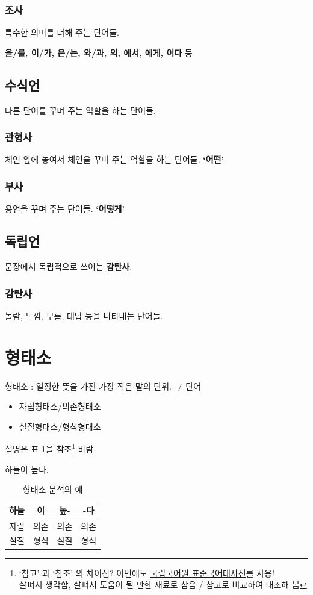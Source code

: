 \documentclass[10pt]{report}
\newcommand{\std}{\href{http://stdweb2.korean.go.kr}{\color{blue}국립국어원 표준국어대사전}}
\begin{document}
\subsubsection{조사}
특수한 의미를 더해 주는 단어들.

\textbf{을/를, 이/가, 은/는, 와/과, 의, 에서, 에게, 이다} 등

\subsection{수식언}
다른 단어를 꾸며 주는 역할을 하는 단어들.

\subsubsection{관형사}
체언 앞에 놓여서 체언을 꾸며 주는 역할을 하는 단어들. \textbf{`어떤'}
\subsubsection{부사}
용언을 꾸며 주는 단어들. \textbf{`어떻게'}

\subsection{독립언}
문장에서 독립적으로 쓰이는 \textbf{감탄사}.
\subsubsection{감탄사}
놀람, 느낌, 부름, 대답 등을 나타내는 단어들.

\section{형태소}
형태소 : 일정한 뜻을 가진 가장 작은 말의 단위. $\neq$단어
\begin{itemize}
\item 자립형태소/의존형태소
\item 실질형태소/형식형태소
\end{itemize}
설명은 표 \ref{morpheme}을 참조\footnote{`참고' 과 `참조' 의 차이점? 이번에도 \std 를 사용!\\ 살펴서 생각함, 살펴서 도움이 될 만한 재료로 삼음 / 참고로 비교하여 대조해 봄} 바람.
\begin{table}
\begin{center}
	하늘이 높다.
		\begin{tabular}{|c|c|c|c|}
			\hline
			하늘 & 이 & 높- & -다 \\
			\hline
			자립 & 의존 & 의존 & 의존 \\
			\hline
			실질 & 형식 & 실질 & 형식 \\
			\hline
		\end{tabular}
	\caption{형태소 분석의 예}
	\label{morpheme}
\end{center}
\end{table}
\end{document}
